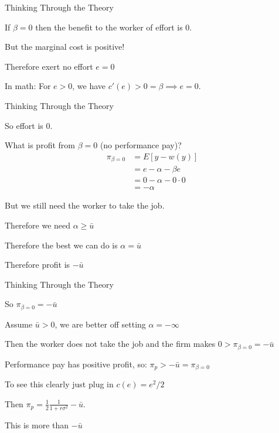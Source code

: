 \documentclass[aspectratio=169,usenames,dvipsnames]{beamer}
\newenvironment{wideitemize}{\itemize\addtolength{\itemsep}{10pt}}{\enditemize}
\begin{document}
\begin{frame}{Thinking Through the Theory}
\begin{wideitemize}
    \item If $\beta=0$ then the benefit to the worker of effort is $0$.
    \item But the marginal cost is positive!
    \item Therefore exert no effort $e=0$
    \item In math: For $e>0$, we have $c'(e)>0=\beta \implies e=0$.
\end{wideitemize}


\end{frame}
\begin{frame}{Thinking Through the Theory}
\begin{wideitemize}
    \item So effort is $0$.
    \item What is profit from $\beta=0$ (no performance pay)?\pause 
  \begin{align*}
        \pi_{\beta=0} &= E[y-w(y)]\\
        &=e - \alpha - \beta e\\
        &= 0 - \alpha - 0\cdot 0\\
        &=-\alpha
    \end{align*}
    \pause
    \item But we still need the worker to take the job.
    \item Therefore we need $\alpha\geq \bar u$
    \item Therefore the best we can do is $\alpha=\bar u$
    \item Therefore profit is $-\bar u$    
    
\end{wideitemize}


\end{frame}
\begin{frame}{Thinking Through the Theory}
\begin{wideitemize}
    \item So $\pi_{\beta=0}=-\bar u$
    \item Assume $\bar u>0$, we are better off setting $\alpha = -\infty$
    \item Then the worker does not take the job and the firm makes $0>\pi_{\beta=0}=-\bar u$
    \item Performance pay has positive profit, so: $\pi_p>-\bar u=\pi_{\beta=0}$
    \begin{wideitemize}
    \item To see this clearly just plug in $c(e)=e^2/2$
    \item Then $\pi_p=\frac{1}{2}\frac{1}{1+r\sigma^2}-\bar u$.
    \item This is more than $-\bar u$
    \end{wideitemize}
\end{wideitemize}


\end{frame}
\end{document}
